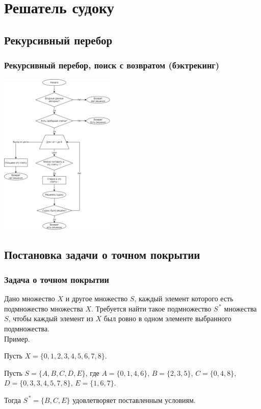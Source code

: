 \documentclass{beamer}
\begin{document}
\section{Решатель судоку}

\subsection{Рекурсивный перебор}
\begin{frame}
\begin{center}
\frametitle{Рекурсивный перебор, поиск с возвратом (бэктрекинг)}
\includegraphics[width=5.5cm]{Sudoku_recursive_scheme}
\end{center}
\end{frame}


\subsection{Постановка задачи о точном покрытии}
\begin{frame}

\frametitle{Задача о точном покрытии}

Дано множество $X$ и другое множество $S$, каждый элемент которого есть подмножество множества $X$. Требуется найти такое подмножество $S^{\,*}$ множества $S$, чтобы каждый элемент из $X$ был ровно в одном элементе выбранного подмножества.\\

Пример.

Пусть $X=\{0,1,2,3,4,5,6,7,8\}$.

Пусть $S=\{A,B,C,D,E\}$, где $A=\{0,1,4,6\}$, $B=\{2,3,5\}$, $C=\{0,4,8\}$, $D=\{0,3,3,4,5,7,8\}$, $E=\{1,6,7\}$.

Тогда $S^{\,*}=\{B,C,E\}$ удовлетворяет поставленным условиям.


\end{frame}
\end{document}
